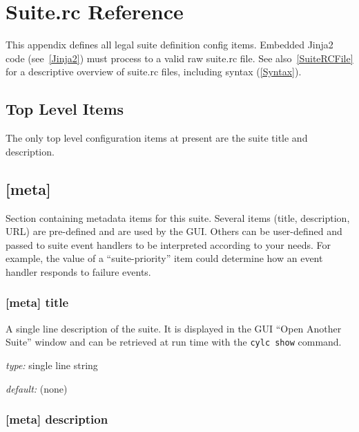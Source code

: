 \section{Suite.rc Reference}
\label{SuiteRCReference}

\lstset{language=bash}

This appendix defines all legal suite definition config items.
Embedded Jinja2 code (see~\ref{Jinja2}) must process to a valid
raw suite.rc file. See also~\ref{SuiteRCFile} for a descriptive
overview of suite.rc files, including syntax (\ref{Syntax}).

\subsection{Top Level Items}

The only top level configuration items at present are the suite title
and description.


\subsection{[meta]}

Section containing metadata items for this suite. Several items
(title, description, URL) are pre-defined and are used by the GUI. Others can be 
user-defined and passed to suite event handlers to be interpreted according to your 
needs. For example, the value of a ``suite-priority'' item could determine how an event 
handler responds to failure events.


\subsubsection[title]{ [meta] \textrightarrow title}

A single line description of the suite. It is displayed in the GUI ``Open Another Suite''
window and can be retrieved at run time with the
\lstinline=cylc show= command.

\begin{myitemize}
\item {\em type:} single line string
\item {\em default:} (none)
\end{myitemize}

\subsubsection[description]{ [meta] \textrightarrow description}

